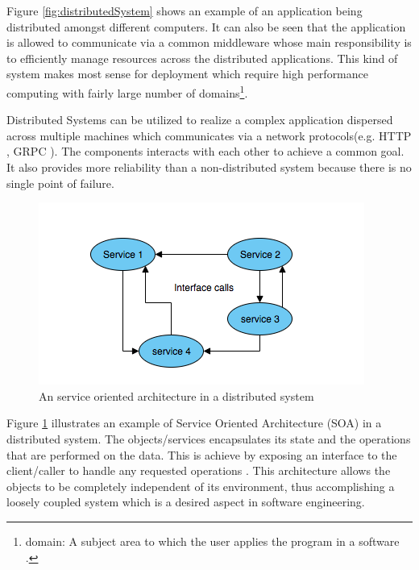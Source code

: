    \newpage
    \par
        Figure \ref{fig:distributedSystem} shows an example of an application being 
        distributed amongst different computers. It can also be seen that the application
        is allowed to communicate via a common middleware whose main responsibility is to
        efficiently manage resources across the distributed applications. This kind of system
        makes most sense for deployment which require high performance computing with fairly
        large number of domains\footnote{domain: A subject area to which the user applies the program in a 
        software \cite{DDD}.}.

    \par
        Distributed Systems can be utilized to realize a complex application dispersed across
        multiple machines which communicates via a network protocols(e.g. HTTP \cite{HTTP}, 
        GRPC \cite{grpc}). The 
        components interacts with each other to achieve a common goal. It also provides
        more reliability than a non-distributed system because there is no single point
        of failure. 

    \begin{figure}[H]
        \centering \includegraphics[scale=0.7]{grafiken/objectBasedDS.png}
        \caption{An service oriented architecture in a distributed system 
            \cite[p.~62]{DistributedSystems}}
        \label{fig:objectBasedDS}
    \end{figure}

    \par
        Figure \ref{fig:objectBasedDS} illustrates an example of Service Oriented Architecture 
        (SOA) in a distributed system. The objects/services encapsulates its state and 
        the operations that are performed on the data. This is achieve by exposing an 
        interface to the client/caller to handle any requested operations
        \cite{DistributedSystems}. This architecture allows the objects to be
        completely independent of its environment, thus accomplishing a loosely
        coupled system which is a desired aspect in software engineering.
        
